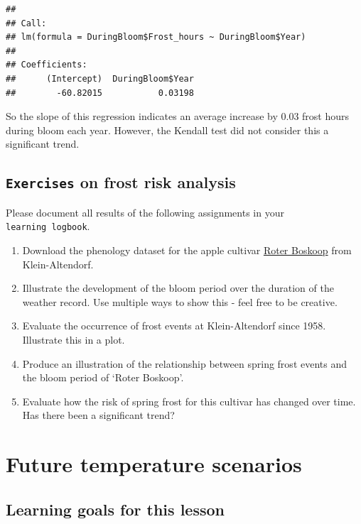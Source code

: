 \documentclass[
]{book}
\providecommand{\tightlist}{%
  \setlength{\itemsep}{0pt}\setlength{\parskip}{0pt}}
\begin{document}
\begin{verbatim}
## 
## Call:
## lm(formula = DuringBloom$Frost_hours ~ DuringBloom$Year)
## 
## Coefficients:
##      (Intercept)  DuringBloom$Year  
##        -60.82015           0.03198
\end{verbatim}

So the slope of this regression indicates an average increase by 0.03 frost hours during bloom each year. However, the Kendall test did not consider this a significant trend.

\hypertarget{exercises_frost_risk}{%
\section*{\texorpdfstring{\texttt{Exercises} on frost risk analysis}{Exercises on frost risk analysis}}\label{exercises_frost_risk}}

Please document all results of the following assignments in your \texttt{learning\ logbook}.

\begin{enumerate}
\def\labelenumi{\arabic{enumi})}
\tightlist
\item
  Download the phenology dataset for the apple cultivar \href{https://uni-bonn.sciebo.de/s/rbCIDSYN9VawCPC}{Roter Boskoop} from Klein-Altendorf.
\item
  Illustrate the development of the bloom period over the duration of the weather record. Use multiple ways to show this - feel free to be creative.
\item
  Evaluate the occurrence of frost events at Klein-Altendorf since 1958. Illustrate this in a plot.
\item
  Produce an illustration of the relationship between spring frost events and the bloom period of `Roter Boskoop'.
\item
  Evaluate how the risk of spring frost for this cultivar has changed over time. Has there been a significant trend?
\end{enumerate}

\hypertarget{future-temperature-scenarios}{%
\chapter{Future temperature scenarios}\label{future-temperature-scenarios}}

\hypertarget{goals_future_temp_scen}{%
\section*{Learning goals for this lesson}\label{goals_future_temp_scen}}
\end{document}
